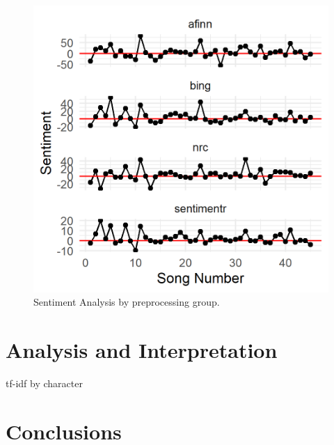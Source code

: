 \documentclass{article}
\begin{document}
\begin{figure}[h]
    \caption{Sentiment Analysis by preprocessing group. \label{fig:sentiment}}
    \centering
    \includegraphics[width=0.2\paperwidth]{sentiment_by_stopwords.png}
\end{figure}



\section{Analysis and Interpretation}

\begin{table}
\caption{tf-idf by character}
\label{tab:tfidf}

\end{table}

\section{Conclusions}



\end{document}
